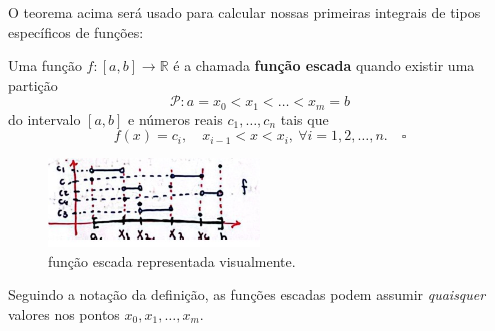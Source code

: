 \documentclass[../analysisII_notes.tex]{subfiles}
\begin{document}
O teorema acima será usado para calcular nossas primeiras integrais de tipos específicos de funções:
\begin{def*}
	Uma função \(f:[a, b]\rightarrow \mathbb{R}\) é a chamada \textbf{função escada} quando existir uma partição
	\[
		\mathcal{P}: a = x_{0} < x_{1} < \dotsc < x_{m}=b
	\]
	do intervalo \([a, b]\) e números reais \(c_{1}, \dotsc , c_{n}\) tais que
	\[
		f(x)=c_{i},\quad x_{i-1}<x<x_{i},\:\forall i=1,2,\dotsc ,n.\quad \square
	\]
\end{def*}
\begin{figure}[H]
	\begin{center}
		\includegraphics[height=0.5\textheight, width=0.5\textwidth, keepaspectratio]{./Images/step_function_06.png}
	\end{center}
	\caption{função escada representada visualmente.}
	\label{stepfunc06}
\end{figure}
Seguindo a notação da definição, as funções escadas podem assumir \textit{quaisquer} valores nos pontos \(x_{0}, x_1, \dotsc , x_{m}.\)
\end{document}

